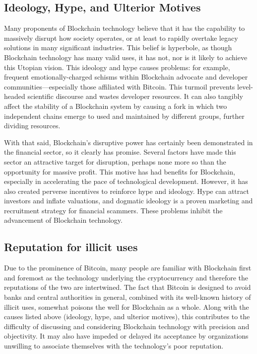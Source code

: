 \subsection{Ideology, Hype, and Ulterior Motives}
Many proponents of Blockchain technology believe that it has the capability to massively disrupt how society operates, or at least to rapidly overtake legacy solutions in many significant industries. This belief is hyperbole, as though Blockchain technology has many valid uses, it has not, nor is it likely to achieve this Utopian vision. This ideology and hype causes problems: for example, frequent emotionally-charged schisms within Blockchain advocate and developer communities---especially those affiliated with Bitcoin. This turmoil prevents level-headed scientific discourse and wastes developer resources. It can also tangibly affect the stability of a Blockchain system by causing a fork in which two independent chains emerge to used and maintained by different groups, further dividing resources.

With that said, Blockchain's disruptive power has certainly been demonstrated in the financial sector, so it clearly has promise. Several factors have made this sector an attractive target for disruption, perhaps none more so than the opportunity for massive profit. This motive has had benefits for Blockchain, especially in accelerating the pace of technological development. However, it has also created perverse incentives to reinforce hype and ideology. Hype can attract investors and inflate valuations, and dogmatic ideology is a proven marketing and recruitment strategy for financial scammers. These problems inhibit the advancement of Blockchain technology.

\subsection{Reputation for illicit uses}
Due to the prominence of Bitcoin, many people are familiar with Blockchain first and foremost as the technology underlying the cryptocurrency and therefore the reputations of the two are intertwined. The fact that Bitcoin is designed to avoid banks and central authorities in general, combined with its well-known history of illicit uses, somewhat poisons the well for Blockchain as a whole. Along with the causes listed above (ideology, hype, and ulterior motives), this contributes to the difficulty of discussing and considering Blockchain technology with precision and objectivity. It may also have impeded or delayed its acceptance by organizations unwilling to associate themselves with the technology's poor reputation.